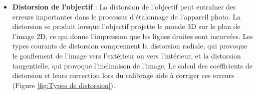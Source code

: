  \begin{itemize}
	\item \textbf{Distorsion de l’objectif } :  La distorsion de l’objectif peut entraîner des erreurs importantes dans le processus d’étalonnage de l’appareil photo. La distorsion se produit lorsque l’objectif projette le monde 3D sur le plan de l’image 2D, ce qui donne l’impression que les lignes droites sont incurvées. Les types courants de distorsion comprennent la distorsion radiale, qui provoque le gonflement de l’image vers l’extérieur ou vers l’intérieur, et la distorsion tangentielle, qui provoque l’inclinaison de l’image. Le calcul des coefficients de distorsion et leurs correction lors du calibrage aide à corriger ces erreurs  (Figure \ref{fig:Types de distorsion}). 
	
	\begin{figure}[h]
		\centering
\end{figure}
\end{itemize}
